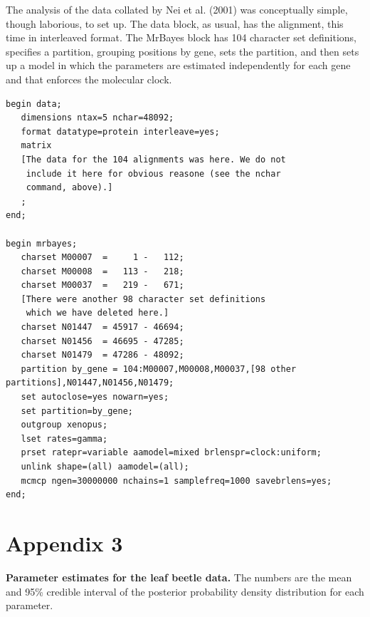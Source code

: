 \documentclass{svmult}
\begin{document}
\bigskip

 The analysis of the data collated by Nei
et al. (2001) was conceptually simple, though laborious, to set up. The data block, as usual, has
the alignment, this time in interleaved format. The MrBayes block has 104 character set
definitions, specifies a partition, grouping positions by gene, sets the partition, and then sets
up a model in which the parameters are estimated independently for each gene and that enforces the
molecular clock.
\scriptsize
\begin{verbatim}
begin data;
   dimensions ntax=5 nchar=48092;
   format datatype=protein interleave=yes;
   matrix
   [The data for the 104 alignments was here. We do not
    include it here for obvious reasone (see the nchar
    command, above).]
   ;
end;

begin mrbayes;
   charset M00007  =     1 -   112;
   charset M00008  =   113 -   218;
   charset M00037  =   219 -   671;
   [There were another 98 character set definitions
    which we have deleted here.]
   charset N01447  = 45917 - 46694;
   charset N01456  = 46695 - 47285;
   charset N01479  = 47286 - 48092;
   partition by_gene = 104:M00007,M00008,M00037,[98 other partitions],N01447,N01456,N01479;
   set autoclose=yes nowarn=yes;
   set partition=by_gene;
   outgroup xenopus;
   lset rates=gamma;
   prset ratepr=variable aamodel=mixed brlenspr=clock:uniform;
   unlink shape=(all) aamodel=(all);
   mcmcp ngen=30000000 nchains=1 samplefreq=1000 savebrlens=yes;
end;

\end{verbatim}
\normalsize


\newpage

\section*{Appendix 3}

{\bf Parameter estimates for the leaf beetle data.} The numbers are the mean and 95\% credible interval
of the posterior probability density distribution for each parameter.
\end{document}
